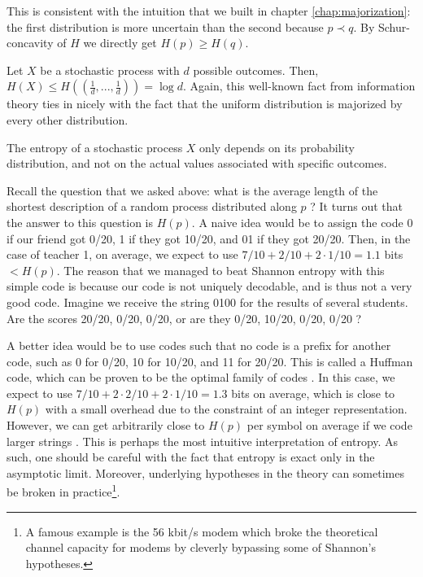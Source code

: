 \begin{remark}
    This is consistent with the intuition that we built in chapter \ref{chap:majorization}: the first distribution is more uncertain than the second because $p \prec q$. By Schur-concavity of $H$ we directly get $H(p) \geq H(q)$.
\end{remark}

\begin{remark}
    Let $X$ be a stochastic process with $d$ possible outcomes. Then, $H(X) \leq H\left(\left(\frac{1}{d}, ..., \frac{1}{d}\right)\right) = \log d$. Again, this well-known fact from information theory ties in nicely with the fact that the uniform distribution is majorized by every other distribution.
\end{remark}

\begin{remark}
    The entropy of a stochastic process $X$ only depends on its probability distribution, and not on the actual values associated with specific outcomes.
\end{remark}

Recall the question that we asked above: what is the average length of the shortest description of a random process distributed along $p$ ? It turns out that the answer to this question is $H(p)$. A naive idea would be to assign the code 0 if our friend got 0/20, 1 if they got 10/20, and 01 if they got 20/20. Then, in the case of teacher 1, on average, we expect to use $7/10 + 2/10 + 2 \cdot 1/10 = 1.1$ bits $< H(p)$. The reason that we managed to beat Shannon entropy with this simple code is because our code is not uniquely decodable, and is thus not a very good code. Imagine we receive the string 0100 for the results of several students. Are the scores 20/20, 0/20, 0/20, or are they 0/20, 10/20, 0/20, 0/20 ?

A better idea would be to use codes such that no code is a prefix for another code, such as 0 for 0/20, 10 for 10/20, and 11 for 20/20. This is called a Huffman code, which can be proven to be the optimal family of codes \cite[p. 123]{cover_elements_2006}. In this case, we expect to use $7/10 + 2 \cdot 2/10 + 2 \cdot 1/10 = 1.3$ bits on average, which is close to $H(p)$ with a small overhead due to the constraint of an integer representation. However, we can get arbitrarily close to $H(p)$ per symbol on average if we code larger strings \cite[p. 114]{cover_elements_2006}. This is perhaps the most intuitive interpretation of entropy. As such, one should be careful with the fact that entropy is exact only in the asymptotic limit. Moreover, underlying hypotheses in the theory can sometimes be broken in practice\footnote{A famous example is the 56 kbit/s modem which broke the theoretical channel capacity for modems by cleverly bypassing some of Shannon's hypotheses.}. %

